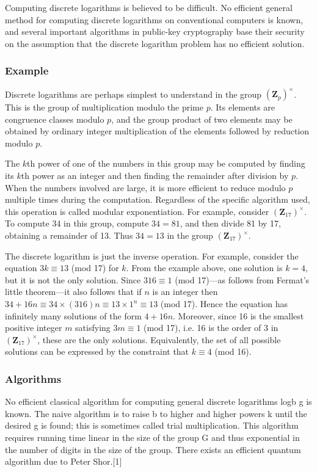 \documentclass[a4paper, 11pt]{article}
\begin{document}
Computing discrete logarithms is believed to be difficult. No efficient general method for computing discrete logarithms on conventional computers is known, and several important algorithms in public-key cryptography base their security on the assumption that the discrete logarithm problem has no efficient solution.

\subsubsection{Example}
Discrete logarithms are perhaps simplest to understand in the group $(\mathbf{Z}_p)^\times$. This is the group of multiplication modulo the prime $p$. Its elements are congruence classes modulo $p$, and the group product of two elements may be obtained by ordinary integer multiplication of the elements followed by reduction modulo $p$.

The $k$th power of one of the numbers in this group may be computed by finding its $k$th power as an integer and then finding the remainder after division by $p$. When the numbers involved are large, it is more efficient to reduce modulo $p$ multiple times during the computation. Regardless of the specific algorithm used, this operation is called modular exponentiation. For example, consider $(\mathbf{Z}_{17})^\times$. To compute 34 in this group, compute $34 = 81$, and then divide 81 by 17, obtaining a remainder of 13. Thus $34 = 13$ in the group $(\mathbf{Z}_{17})^\times$.

The discrete logarithm is just the inverse operation. For example, consider the equation $3k \equiv 13$ (mod 17) for $k$. From the example above, one solution is $k = 4$, but it is not the only solution. Since $316 \equiv 1$ (mod 17)---as follows from Fermat's little theorem---it also follows that if $n$ is an integer then $34+16n \equiv 34 \times (316)n \equiv 13 \times 1^n \equiv 13$ (mod 17). Hence the equation has infinitely many solutions of the form $4 + 16n$. Moreover, since 16 is the smallest positive integer $m$ satisfying $3m \equiv 1$ (mod 17), i.e. 16 is the order of 3 in $(\mathbf{Z}_{17})^\times$, these are the only solutions. Equivalently, the set of all possible solutions can be expressed by the constraint that $k \equiv 4$ (mod 16).

\subsubsection{Algorithms}
No efficient classical algorithm for computing general discrete logarithms logb g is known. The naive algorithm is to raise b to higher and higher powers k until the desired g is found; this is sometimes called trial multiplication. This algorithm requires running time linear in the size of the group G and thus exponential in the number of digits in the size of the group. There exists an efficient quantum algorithm due to Peter Shor.[1]
\end{document}
